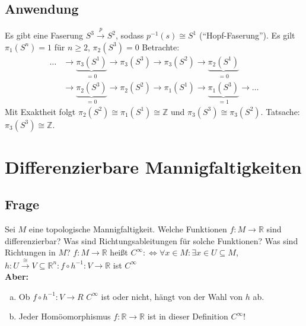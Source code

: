 \subsection{Anwendung} %
\label{sub:1412}
Es gibt eine Faserung $S^3 \xrightarrow{p} S^2 $, sodass $p ^{-1}(s) \cong S^1$ (\enquote{Hopf-Faserung}). Es gilt $\pi_1(S^n)= 1$ für $n \ge 2$, $\pi_2(S^3)= 0$
Betrachte:
\begin{align*}
	\ldots  &\longrightarrow \underbrace{\pi_3(S^1)}_{=0} \longrightarrow \pi_3(S^3) \longrightarrow \pi_3(S^2) \longrightarrow \underbrace{\pi_2(S^1)}_{=0} \\
	&\longrightarrow \underbrace{\pi_2(S^3)}_{=0} \longrightarrow \pi_2(S^2) \longrightarrow \pi_1(S^1) \longrightarrow \underbrace{\pi_1(S^3)}_{=1} \longrightarrow \ldots 
\end{align*}
Mit Exaktheit folgt $\pi_2(S^2) \cong \pi_1(S^1) \cong \mathds{Z}$ und $\pi_3(S^3) \cong \pi_3(S^2)$. Tatsache: $\pi_3(S^3) \cong \mathds{Z}$.
\newpage

\section{Differenzierbare Mannigfaltigkeiten} %
\label{sec:15}

\subsection[Frage zur Differenzierbarkeit von Funktionen auf Mannigfaltigkeiten]{Frage} %
\label{sub:151}
Sei $M$ eine topologische Mannigfaltigkeit. Welche Funktionen $f : M \to \mathds{R}$ sind differenzierbar? Was sind Richtungsableitungen für solche Funktionen? Was sind 
Richtungen in $M$?
$f : M \to \mathds{R}$ heißt $C^\infty :\Leftrightarrow \forall x \in M : \exists x \in U \subseteq M$, $h : U \xrightarrow{\cong}  V \subseteq \mathds{R}^n : f \circ h ^{-1} : V \to \mathds{R}$ ist $C^\infty$ \\
\textbf{Aber:}
\begin{enumerate}[a)]
	\item Ob $f \circ h ^{-1} : V \to R$ $C^\infty$ ist oder nicht, hängt von der Wahl von $h$ ab.
	\item Jeder Homöomorphismus $f : \mathds{R} \to \mathds{R}$ ist in dieser Definition $C^\infty$!
\end{enumerate}

